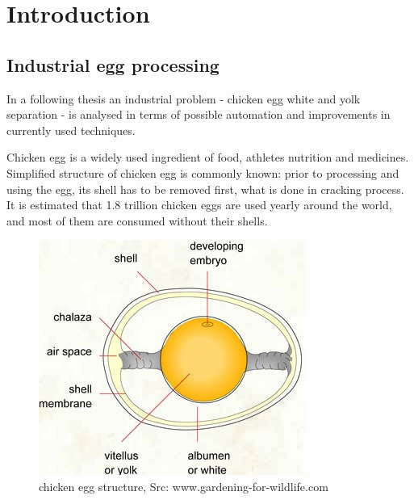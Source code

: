 \documentclass[12pt,twoside,a4paper]{article}
\begin{document}
\tableofcontents


\section{Introduction}
\subsection{Industrial egg processing}
In a following thesis an industrial problem - chicken egg white and yolk separation - is analysed in terms of possible automation and improvements in currently used techniques.

Chicken egg is a widely used ingredient of food, athletes nutrition and medicines. Simplified structure of chicken egg is commonly known: prior to processing and using the egg, its shell has to be removed first, what is done in cracking process. It is estimated that 1.8 trillion chicken eggs are used yearly around the world\cite{trillion}, and most of them are consumed without their shells. 

\begin{figure}[H]
\centering
\includegraphics[width=0.4\paperwidth]{structure}
\caption{chicken egg structure, Src: www.gardening-for-wildlife.com}
\end{figure}
\end{document}
